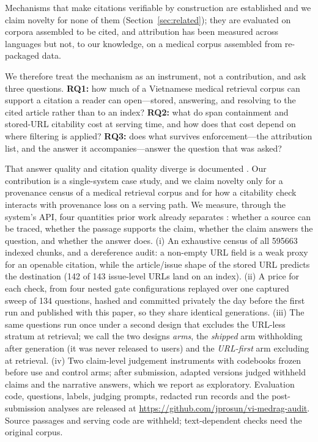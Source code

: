 \documentclass[conference,a4paper]{IEEEtran}
\begin{document}
Mechanisms that make citations verifiable by construction are established and we claim
novelty for none of them (Section~\ref{sec:related}); they are evaluated on corpora assembled
to be cited, and attribution has been measured across languages \cite{muller2023xorattriqa}
but not, to our knowledge, on a medical corpus assembled from re-packaged data.

We therefore treat the mechanism as an instrument, not a contribution, and ask three
questions. \textbf{RQ1:} how much of a Vietnamese medical retrieval corpus can support a
citation a reader can open---stored, answering, and resolving to the cited article rather
than to an index? \textbf{RQ2:} what do span containment and stored-URL
citability cost at serving time, and how does that cost depend on where filtering is applied?
\textbf{RQ3:} does what survives enforcement---the attribution list, and the answer it
accompanies---answer the question that was asked?

That answer quality and citation quality diverge is documented
\cite{liu2023verifiability,malaviya2024expertqa,wang2025medcite}. Our contribution is a
single-system case study, and we claim novelty only for a provenance census of a medical
retrieval corpus and for how a citability check interacts with provenance loss on a serving
path. We measure, through the system's API, four quantities prior work already separates
\cite{malaviya2024expertqa}: whether a source can be traced, whether the passage supports the
claim, whether the claim answers the question, and whether the answer does.
(i) An exhaustive census of all \num{595663} indexed chunks, and a dereference audit: a
non-empty URL field is a weak proxy for an openable citation, while the article/issue shape of
the stored URL predicts the destination (\num{142} of \num{143} issue-level URLs land on an index).
(ii) A price for each check, from four nested gate configurations replayed over one captured
sweep of 134 questions, hashed and committed privately the day before the first run and
published with this paper, so they share identical generations. (iii) The same questions run
once under a second design that excludes the URL-less stratum at retrieval; we call the two
designs \emph{arms}, the \emph{shipped} arm withholding after generation (it was never
released to users) and the \emph{URL-first} arm excluding at retrieval. (iv) Two claim-level
judgement instruments with codebooks frozen
before use and control arms; after submission, adapted versions judged withheld claims and the
narrative answers, which we report as exploratory. Evaluation code, questions, labels, judging
prompts, redacted run records and the post-submission analyses are released at
\url{https://github.com/jprosun/vi-medrag-audit}.
Source passages and serving code are withheld; text-dependent checks need the original corpus.
\end{document}
